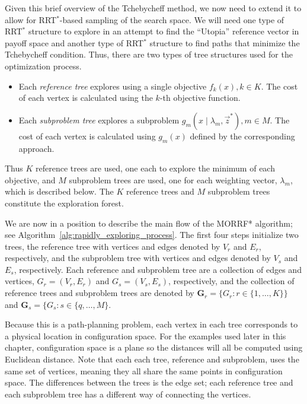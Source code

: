 \documentclass[conference]{IEEEtran}
\begin{document}

Given this brief overview of the Tchebycheff method, we now need to extend it to allow for RRT$^{*}$-based sampling of the search space.  
We will need one type of RRT$^{*}$ structure to explore in an attempt to find the ``Utopia'' reference vector in payoff space and another type of RRT$^{*}$ structure to find paths that minimize the Tchebycheff condition.  
Thus, there are two types of tree structures used for the optimization process.
\begin{itemize}
\item Each \emph{reference tree} explores using a single objective $ f_{k} (x), k \in K $. 
The cost of each vertex is calculated using the $ k $-th objective function.
\item Each \emph{subproblem tree} explores a subproblem $ g_{m} ( x \mid \lambda_{m} , \vec{z}^{*} ) , m \in M $.
The cost of each vertex is calculated using $ g_{m}(x) $ defined by the corresponding approach.
\end{itemize}
Thus $ K $ reference trees are used, one each to explore the minimum of each objective, and $ M $ subproblem trees are used, one for each weighting vector, $ \lambda_{m} $, which is described below.  
The $K$ reference trees and $M$ subproblem trees constitute the exploration forest.

We are now in a position to describe the main flow of the MORRF* algorithm; see Algorithm~\ref{alg:rapidly_exploring_process}.  
The first four steps initialize two trees, the reference tree with vertices and edges denoted by $V_r$ and $E_r$, respectively, and the subproblem tree with vertices and edges denoted by $V_s$ and $E_s$, respectively.  
Each reference and subproblem tree are a collection of edges and vertices, $G_r=(V_r,E_r)$ and $G_s=(V_s,E_s)$, respectively, and the collection of reference trees and subproblem trees are denoted by ${\mathbf G}_r = \{G_r: r\in \{1, \ldots, K\}\}$ and ${\mathbf G}_s = \{G_s: s \in \{q, \ldots, M\}$.  

Because this is a path-planning problem, each vertex in each tree corresponds to a physical location in configuration space.  
For the examples used later in this chapter, configuration space is a plane so the distances will all be computed using Euclidean distance. 
Note that each each tree, reference and subproblem, uses the same set of vertices, meaning they all share the same points in configuration space.  
The differences between the trees is the edge set; each reference tree and each subproblem tree has a different way of connecting the vertices.
\end{document}
